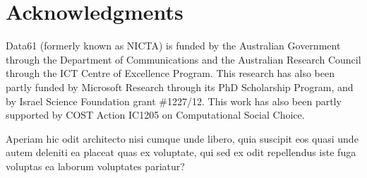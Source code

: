 \documentclass[letterpaper]{article}
\begin{document}
\section*{Acknowledgments}
Data61 (formerly known as NICTA) is funded by the Australian Government through the Department of Communications and the Australian Research Council through the ICT Centre of Excellence Program. This research has also been partly funded by Microsoft Research through its PhD Scholarship Program, and by Israel Science Foundation grant \#1227/12. This work has also been partly supported by COST Action IC1205 on Computational Social Choice.

\normalsize

Aperiam hic odit architecto nisi cumque unde libero, quia suscipit eos quasi unde autem deleniti ea placeat quas ex voluptate, qui sed ex odit repellendus iste fuga voluptas ea laborum voluptates pariatur?\clearpage

\end{document}
